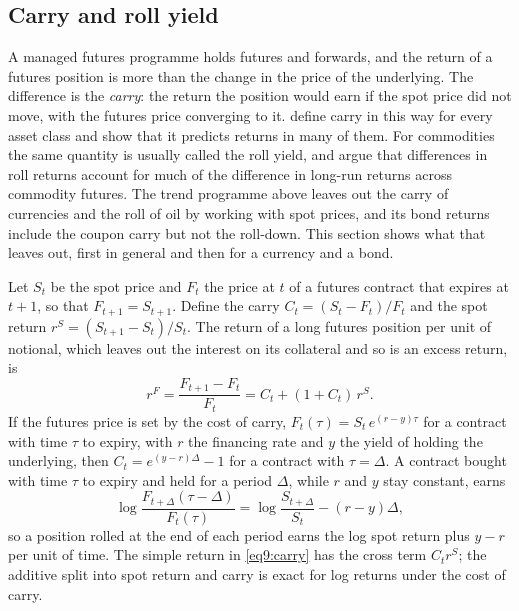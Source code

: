 \begin{chapterrefs}
\FloatBarrier
\section{Carry and roll yield}
\label{sec9:carry}

A managed futures programme holds futures and forwards, and the return of a futures position is more
than the change in the price of the underlying. The difference is the \emph{carry}: the return the
position would earn if the spot price did not move, with the futures price converging to it. \textcite{koijen2018} define carry in this
way for every asset class and show that it predicts returns in many of them. For commodities the same
quantity is usually called the roll yield, and \textcite{erb2006} argue that differences in roll
returns account for much of the difference in long-run returns across commodity futures. The trend
programme above leaves out the carry of currencies and the roll of oil by working with spot prices,
and its bond returns include the coupon carry but not the roll-down. This
section shows what that leaves out, first in general and then for a currency and a bond.

\begin{proposition}\label{prop9:carry}
Let $S_t$ be the spot price and $F_t$ the price at $t$ of a futures contract that expires at $t+1$, so
that $F_{t+1}=S_{t+1}$. Define the carry $C_t=(S_t-F_t)/F_t$ and the spot return $r^S=(S_{t+1}-S_t)/S_t$.
The return of a long futures position per unit of notional, which leaves out the interest on its
collateral and so is an excess return, is
\begin{equation}\label{eq9:carry}
  r^F=\frac{F_{t+1}-F_t}{F_t}=C_t+(1+C_t)\,r^S .
\end{equation}
If the futures price is set by the cost of carry, $F_t(\tau)=S_t\,e^{(r-y)\tau}$ for a contract with time
$\tau$ to expiry, with $r$ the financing rate and $y$ the yield of holding the underlying, then
$C_t=e^{(y-r)\Delta}-1$ for a contract with $\tau=\Delta$. A contract bought with time $\tau$ to expiry and
held for a period $\Delta$, while $r$ and $y$ stay constant, earns
\begin{equation}\label{eq9:roll}
  \log\frac{F_{t+\Delta}(\tau-\Delta)}{F_t(\tau)}=\log\frac{S_{t+\Delta}}{S_t}-(r-y)\Delta ,
\end{equation}
so a position rolled at the end of each period earns the log spot return plus $y-r$ per unit of time.
The simple return in \cref{eq9:carry} has the cross term $C_tr^S$; the additive split into spot return
and carry is exact for log returns under the cost of carry.
\end{proposition}


\end{chapterrefs}

